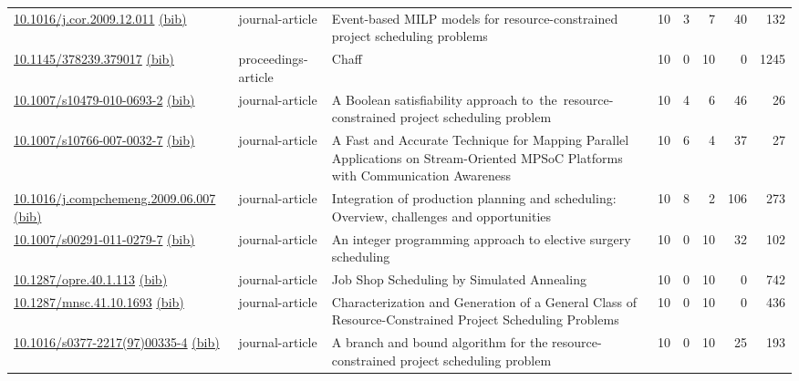 {\begin{longtable}{p{5cm}lp{11cm}rrrrr}
\href{http://dx.doi.org/10.1016/j.cor.2009.12.011}{10.1016/j.cor.2009.12.011} \href{https://www.doi2bib.org/bib/10.1016/j.cor.2009.12.011}{(bib)} & journal-article & Event-based MILP models for resource-constrained project scheduling problems & 10 & 3 & 7 & 40 & 132 \\
\href{http://dx.doi.org/10.1145/378239.379017}{10.1145/378239.379017} \href{https://www.doi2bib.org/bib/10.1145/378239.379017}{(bib)} & proceedings-article & Chaff & 10 & 0 & 10 & 0 & 1245 \\
\href{http://dx.doi.org/10.1007/s10479-010-0693-2}{10.1007/s10479-010-0693-2} \href{https://www.doi2bib.org/bib/10.1007/s10479-010-0693-2}{(bib)} & journal-article & A Boolean satisfiability approach to the resource-constrained project scheduling problem & 10 & 4 & 6 & 46 & 26 \\
\href{http://dx.doi.org/10.1007/s10766-007-0032-7}{10.1007/s10766-007-0032-7} \href{https://www.doi2bib.org/bib/10.1007/s10766-007-0032-7}{(bib)} & journal-article & A Fast and Accurate Technique for Mapping Parallel Applications on Stream-Oriented MPSoC Platforms with Communication Awareness & 10 & 6 & 4 & 37 & 27 \\
\href{http://dx.doi.org/10.1016/j.compchemeng.2009.06.007}{10.1016/j.compchemeng.2009.06.007} \href{https://www.doi2bib.org/bib/10.1016/j.compchemeng.2009.06.007}{(bib)} & journal-article & Integration of production planning and scheduling: Overview, challenges and opportunities & 10 & 8 & 2 & 106 & 273 \\
\href{http://dx.doi.org/10.1007/s00291-011-0279-7}{10.1007/s00291-011-0279-7} \href{https://www.doi2bib.org/bib/10.1007/s00291-011-0279-7}{(bib)} & journal-article & An integer programming approach to elective surgery scheduling & 10 & 0 & 10 & 32 & 102 \\
\href{http://dx.doi.org/10.1287/opre.40.1.113}{10.1287/opre.40.1.113} \href{https://www.doi2bib.org/bib/10.1287/opre.40.1.113}{(bib)} & journal-article & Job Shop Scheduling by Simulated Annealing & 10 & 0 & 10 & 0 & 742 \\
\href{http://dx.doi.org/10.1287/mnsc.41.10.1693}{10.1287/mnsc.41.10.1693} \href{https://www.doi2bib.org/bib/10.1287/mnsc.41.10.1693}{(bib)} & journal-article & Characterization and Generation of a General Class of Resource-Constrained Project Scheduling Problems & 10 & 0 & 10 & 0 & 436 \\
\href{http://dx.doi.org/10.1016/s0377-2217(97)00335-4}{10.1016/s0377-2217(97)00335-4} \href{https://www.doi2bib.org/bib/10.1016/s0377-2217(97)00335-4}{(bib)} & journal-article & A branch and bound algorithm for the resource-constrained project scheduling problem & 10 & 0 & 10 & 25 & 193 \\

\end{longtable}}
